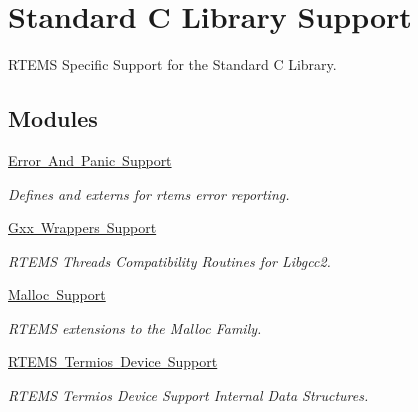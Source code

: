 \hypertarget{group__libcsupport}{}\section{Standard C Library Support}
\label{group__libcsupport}


R\+T\+E\+MS Specific Support for the Standard C Library.  


\subsection*{Modules}
\begin{DoxyCompactItemize}
\item 
\mbox{\hyperlink{group__ErrorPanicSupport}{Error And Panic Support}}
\begin{DoxyCompactList}\small\item\em Defines and externs for rtems error reporting. \end{DoxyCompactList}\item 
\mbox{\hyperlink{group__GxxWrappersSupport}{Gxx Wrappers Support}}
\begin{DoxyCompactList}\small\item\em R\+T\+E\+MS Threads Compatibility Routines for Libgcc2. \end{DoxyCompactList}\item 
\mbox{\hyperlink{group__MallocSupport}{Malloc Support}}
\begin{DoxyCompactList}\small\item\em R\+T\+E\+MS extensions to the Malloc Family. \end{DoxyCompactList}\item 
\mbox{\hyperlink{group__TermiostypesSupport}{R\+T\+E\+M\+S Termios Device Support}}
\begin{DoxyCompactList}\small\item\em R\+T\+E\+MS Termios Device Support Internal Data Structures. \end{DoxyCompactList}\end{DoxyCompactItemize}
